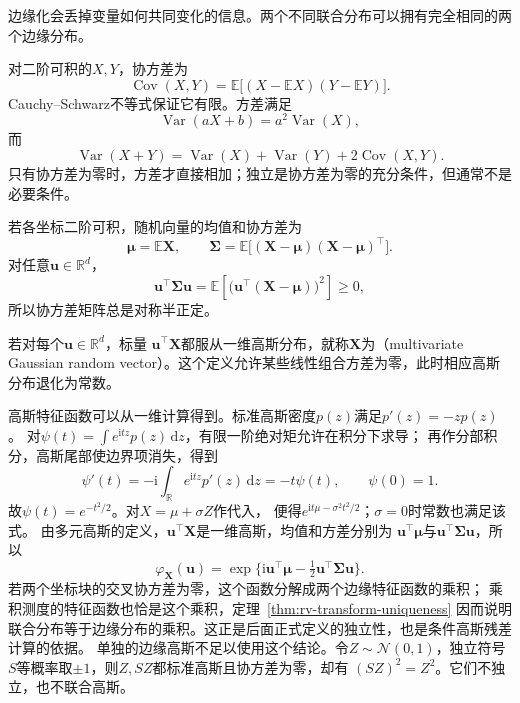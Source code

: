 边缘化会丢掉变量如何共同变化的信息。两个不同联合分布可以拥有完全相同的两个边缘分布。

对二阶可积的\(X,Y\)，协方差为
\[ \operatorname{Cov}(X,Y)
  =\mathbb{E}\bigl[(X-\mathbb{E}X)(Y-\mathbb{E}Y)\bigr]. \]
Cauchy--Schwarz不等式保证它有限。方差满足
\[ \operatorname{Var}(aX+b)=a^2\operatorname{Var}(X), \]
而
\[ \operatorname{Var}(X+Y)
  =\operatorname{Var}(X)+\operatorname{Var}(Y)+2\operatorname{Cov}(X,Y). \]
只有协方差为零时，方差才直接相加；独立是协方差为零的充分条件，但通常不是必要条件。

若各坐标二阶可积，随机向量的均值和协方差为
\[ \bm{\mu}=\mathbb{E}\bm{X},
  \qquad\bm{\Sigma}=\mathbb{E}\bigl[(\bm{X}-\bm{\mu})(\bm{X}-\bm{\mu})^{\top}\bigr]. \]
对任意\(\bm{u}\in\mathbb{R}^d\)，
\[
  \bm{u}^{\top}\bm{\Sigma}\bm{u}
  =\mathbb{E}\left[
    \bigl(\bm{u}^{\top}(\bm{X}-\bm{\mu})\bigr)^2
  \right]\geq0,
\]
所以协方差矩阵总是对称半正定。
\begin{definition}[多元高斯随机向量]
  \label{def:probability-multivariate-gaussian}
  若对每个\(\bm{u}\in\mathbb{R}^d\)，标量
\(\bm{u}^{\top}\bm{X}\)都服从一维高斯分布，就称\(\bm{X}\)为（multivariate Gaussian random vector）。这个定义允许某些线性组合方差为零，此时相应高斯分布退化为常数。
\end{definition}

高斯特征函数可以从一维计算得到。标准高斯密度\(p(z)\)满足\(p'(z)=-zp(z)\)。
对\(\psi(t)=\int e^{\mathrm itz}p(z)\,\mathrm dz\)，有限一阶绝对矩允许在积分下求导；
再作分部积分，高斯尾部使边界项消失，得到
\[
 \psi'(t)
 =-\mathrm i\int_{\mathbb R}e^{\mathrm itz}p'(z)\,\mathrm dz
 =-t\psi(t),\qquad \psi(0)=1.
\]
故\(\psi(t)=e^{-t^2/2}\)。对\(X=\mu+\sigma Z\)作代入，
便得\(e^{\mathrm it\mu-\sigma^2t^2/2}\)；\(\sigma=0\)时常数也满足该式。
由多元高斯的定义，\(\bm u^\top\bm X\)是一维高斯，均值和方差分别为
\(\bm u^\top\bm\mu\)与\(\bm u^\top\bm\Sigma\bm u\)，所以
\[
\varphi_{\bm X}(\bm u)
=\exp\{\mathrm i\bm u^\top\bm\mu-\tfrac12\bm u^\top\bm\Sigma\bm u\}.
\]
若两个坐标块的交叉协方差为零，这个函数分解成两个边缘特征函数的乘积；
乘积测度的特征函数也恰是这个乘积，定理~\ref{thm:rv-transform-uniqueness}
因而说明联合分布等于边缘分布的乘积。这正是后面正式定义的独立性，也是条件高斯残差计算的依据。
单独的边缘高斯不足以使用这个结论。令\(Z\sim\mathcal N(0,1)\)，独立符号\(S\)等概率取\(\pm1\)，则\(Z,SZ\)都标准高斯且协方差为零，却有
\((SZ)^2=Z^2\)。它们不独立，也不联合高斯。

